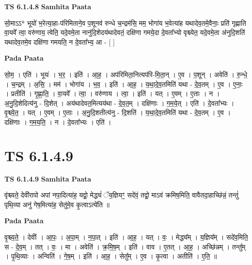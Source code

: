 \documentclass[17pt]{extarticle}
\begin{document}
\textbf{TS 6.1.4.8 } \newline
\textbf{Samhita Paata} \newline

सो॒माऽऽ* भूयो॑ भ॒रेत्या॒हा-प॑रिमिताने॒व प॒शूनव॑ रुन्धे च॒न्द्रम॑सि॒ मम॒ भोगा॑य भ॒वेत्या॑ह यथादेव॒तमे॒वैनाः॒ प्रति॑ गृह्णाति वा॒यवे᳚ त्वा॒ वरु॑णाय॒ त्वेति॒ यदे॒वमे॒ता नानु॑दि॒शेदय॑थादेवतं॒ दक्षि॑णा गमये॒दा दे॒वता᳚भ्यो वृश्च्येत॒ यदे॒वमे॒ता अ॑नुदि॒शति॑ यथादेव॒तमे॒व दक्षि॑णा गमयति॒ न दे॒वता᳚भ्य॒ आ - [  ] \newline

\textbf{Pada Paata} \newline

सो॒म॒ । एति॑ । भूयः॑ । भ॒र॒ । इति॑ । आ॒ह॒ । अप॑रिमिता॒नित्यप॑रि-मि॒ता॒न् । ए॒व । प॒शून् । अवेति॑ । रु॒न्धे॒ । च॒न्द्रम् । अ॒सि॒ । मम॑ । भोगा॑य । भ॒व॒ । इति॑ । आ॒ह॒ । य॒था॒दे॒व॒तमिति॑ यथा - दे॒व॒तम् । ए॒व । ए॒नाः॒ । प्रतीति॑ । गृ॒ह्णा॒ति॒ । वा॒यवे᳚ । त्वा॒ । वरु॑णाय । त्वा॒ । इति॑ । यत् । ए॒वम् । ए॒ताः । न । अ॒नु॒दि॒शेदित्य॑नु - दि॒शेत् । अय॑थादेवत॒मित्यय॑था - दे॒व॒त॒म् । दक्षि॑णाः । ग॒म॒ये॒त् । एति॑ । दे॒वता᳚भ्यः । वृ॒श्च्ये॒त॒ । यत् । ए॒वम् । ए॒ताः । अ॒नु॒दि॒शतीत्य॑नु - दि॒शति॑ । य॒था॒दे॒व॒तमिति॑ यथा - दे॒व॒तम् । ए॒व । दक्षि॑णाः । ग॒म॒य॒ति॒ । न । दे॒वता᳚भ्यः । एति॑ ।  \newline




\section*{ TS 6.1.4.9 }

\textbf{TS 6.1.4.9 } \newline
\textbf{Samhita Paata} \newline

वृ॑श्च्यते॒ देवी॑रापो अपां नपा॒दित्या॑ह॒ यद्वो॒ मेद्ध्यं॑ ॅय॒ज्ञियꣳ॒॒ सदे॑वं॒ तद्वो॒ माऽव॑ क्रमिष॒मिति॒ वावैतदा॒हाच्छि॑न्नं॒ तन्तुं॑ पृथि॒व्या अनु॑ गेष॒मित्या॑ह॒ सेतु॑मे॒व कृ॒त्वाऽत्ये॑ति ॥ \newline

\textbf{Pada Paata} \newline

वृ॒श्च्य॒ते॒ । देवीः᳚ । आ॒पः॒ । अ॒पा॒म् । न॒पा॒त् । इति॑ । आ॒ह॒ । यत् । वः॒ । मेद्ध्य᳚म् । य॒ज्ञिय᳚म् । सदे॑व॒मिति॒ स - दे॒व॒म् । तत् । वः॒ । मा । अवेति॑ । क्र॒मि॒ष॒म् । इति॑ । वाव । ए॒तत् । आ॒ह॒ । अच्छि॑न्नम् । तन्तु᳚म् । पृ॒थि॒व्याः । अन्विति॑ । गे॒ष॒म् । इति॑ । आ॒ह॒ । सेतु᳚म् । ए॒व । कृ॒त्वा । अतीति॑ । ए॒ति॒ ॥  \newline
\end{document}

